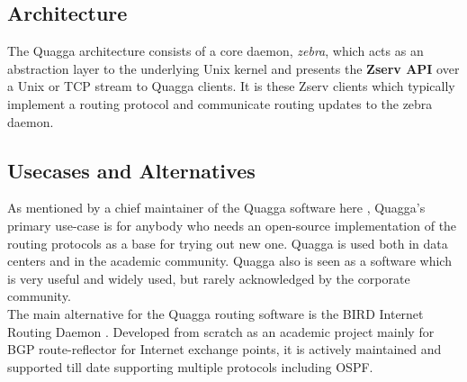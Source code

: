 \documentclass{article}
\begin{document}
\subsection{Architecture}
The Quagga architecture consists of a core daemon, \textit{zebra}, which acts as an abstraction 
layer to the underlying Unix kernel and presents the \textbf{Zserv API} over a Unix or TCP stream 
to Quagga clients. It is these Zserv clients which typically implement a routing protocol 
and communicate routing updates to the zebra daemon.\cite{quaggaofficial}

\subsection{Usecases and Alternatives}
As mentioned by a chief maintainer of the Quagga software here \cite{martininterview}, Quagga's
primary use-case is for anybody who needs an open-source implementation of the routing protocols
as a base for trying out new one. Quagga is used both in data centers and in the academic community. 
Quagga also is seen as a software which is very useful and widely used, but rarely acknowledged by the corporate community.\\
The main alternative for the Quagga routing software is the BIRD Internet Routing Daemon \cite{bird}.
Developed from scratch as an academic project mainly for BGP route-reflector for Internet exchange points, 
it is actively maintained and supported till date supporting multiple protocols including OSPF.

\clearpage
\end{document}
